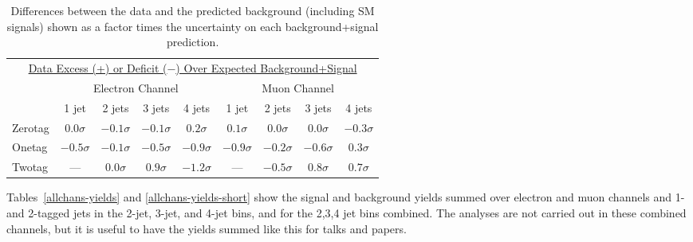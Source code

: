 \begin{table}[!h!tbp]
\begin{center}
\begin{minipage}{4in}
\begin{ruledtabular}
\begin{tabular}{l||cccc|cccc}
\multicolumn{9}{c}{\underline{Data Excess (+) or
Deficit ($-$) Over Expected Background+Signal}} \vspace{0.1in} \\
& \multicolumn{4}{c|}{Electron Channel} & \multicolumn{4}{c}{Muon Channel} \\
         & 1 jet & 2 jets & 3 jets & 4 jets
         & 1 jet & 2 jets & 3 jets & 4 jets \\
\hline
Zerotag  &  $0.0 \sigma$ & $-0.1 \sigma$ & $-0.1 \sigma$ &  $0.2 \sigma$ &  $0.1 \sigma$ &  $0.0 \sigma$ &  $0.0 \sigma$ & $-0.3 \sigma$ \\
Onetag   & $-0.5 \sigma$ & $-0.1 \sigma$ & $-0.5 \sigma$ & $-0.9 \sigma$ & $-0.9 \sigma$ & $-0.2 \sigma$ & $-0.6 \sigma$ &  $0.3 \sigma$ \\
Twotag   &       ---     &  $0.0 \sigma$ &  $0.9 \sigma$ & $-1.2 \sigma$ &       ---     & $-0.5 \sigma$ &  $0.8 \sigma$ &  $0.7 \sigma$ 
\end{tabular}
\end{ruledtabular}
\vspace{-0.1in}
\caption[yieldconsistency]{Differences between the data and the
predicted background (including SM signals) shown as a factor times the
uncertainty on each background+signal prediction.}
\label{yield-consistency}
\end{minipage}
\end{center}
\end{table}

Tables~\ref{allchans-yields} and \ref{allchans-yields-short} show the
signal and background yields summed over electron and muon channels
and 1- and 2-tagged jets in the 2-jet, 3-jet, and 4-jet bins, and for
the 2,3,4 jet bins combined. The analyses are not carried out in these
combined channels, but it is useful to have the yields summed like
this for talks and papers.

